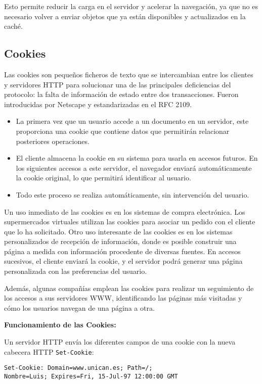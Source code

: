 \documentclass[a4paper,12pt]{article}
\begin{document}
Esto permite reducir la carga en el servidor y acelerar la navegación, ya que no es necesario volver a enviar objetos que ya están disponibles y actualizados en la caché.

\subsection{Cookies}

Las cookies son pequeños ficheros de texto que se intercambian entre los clientes y servidores HTTP para solucionar una de las principales deficiencias del protocolo: la falta de información de estado entre dos transacciones. Fueron introducidas por Netscape y estandarizadas en el RFC 2109.

\begin{itemize}
    \item La primera vez que un usuario accede a un documento en un servidor, este proporciona una cookie que contiene datos que permitirán relacionar posteriores operaciones.
    \item El cliente almacena la cookie en su sistema para usarla en accesos futuros. En los siguientes accesos a este servidor, el navegador enviará automáticamente la cookie original, lo que permitirá identificar al usuario.
    \item Todo este proceso se realiza automáticamente, sin intervención del usuario.
\end{itemize}

Un uso inmediato de las cookies es en los sistemas de compra electrónica. Los supermercados virtuales utilizan las cookies para asociar un pedido con el cliente que lo ha solicitado. Otro uso interesante de las cookies es en los sistemas personalizados de recepción de información, donde es posible construir una página a medida con información procedente de diversas fuentes. En accesos sucesivos, el cliente enviará la cookie, y el servidor podrá generar una página personalizada con las preferencias del usuario.

Además, algunas compañías emplean las cookies para realizar un seguimiento de los accesos a sus servidores WWW, identificando las páginas más visitadas y cómo los usuarios navegan de una página a otra.

\textbf{Funcionamiento de las Cookies:}

Un servidor HTTP envía los diferentes campos de una cookie con la nueva cabecera HTTP \texttt{Set-Cookie}:

\begin{verbatim}
Set-Cookie: Domain=www.unican.es; Path=/; 
Nombre=Luis; Expires=Fri, 15-Jul-97 12:00:00 GMT
\end{verbatim}
\end{document}
